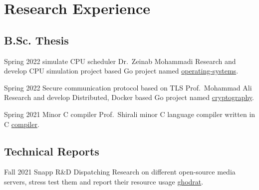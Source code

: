\section{Research Experience}

\subsection{B.Sc. Thesis}

\cventry%
  {Spring 2022}
  {simulate CPU scheduler}
  {}
  {Dr.\ Zeinab Mohammadi}
  {}{%
    Research and develop CPU simulation project based Go project named \href{https://github.com/mohammadne/university}{operating-systems}.
  }

\cventry%
  {Spring 2022}
  {Secure communication protocol based on TLS}
  {}
  {Prof.\ Mohammad Ali}
  {}{%
    Research and develop Distributed, Docker based Go project named \href{https://github.com/mohammadne/university}{cryptography}.
  }

\cventry%
  {Spring 2021}
  {Minor C compiler}
  {}
  {Prof.\ Shirali}
  {}{%
    minor C language compiler written in C \href{https://github.com/mohammadne/university}{compiler}.
  }

\subsection{Technical Reports}

\cventry%
  {Fall 2021}
  {Snapp R&D}
  {}
  {Dispatching}
  {}{%
    Research on different open-source media servers, stress test them and report their resource usage \href{https://github.com/snapp-incubator/ghodrat}{ghodrat}.
  }